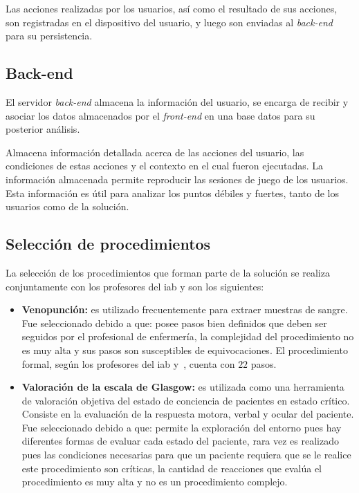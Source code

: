 Las acciones realizadas por los usuarios, así como el resultado de sus acciones,
son registradas en el dispositivo del usuario, y luego son enviadas al
\textit{back-end} para su persistencia.

\subsection{Back-end}

El servidor \textit{back-end} almacena la información del usuario, se encarga
de recibir y asociar los datos almacenados por el \textit{front-end} en una
base datos para su posterior análisis.


Almacena información detallada acerca de las acciones del usuario,
las condiciones de estas acciones y el contexto en el cual fueron ejecutadas.
La información almacenada permite reproducir las sesiones de juego
de los usuarios. Esta información es útil para analizar los puntos débiles y
fuertes, tanto de los usuarios como de la solución.

\subsection{Selección de procedimientos}

La selección de los procedimientos que forman parte de la solución se realiza
conjuntamente con los profesores del \Gls{iab} y son los siguientes:

\begin{itemize}
\item \textbf{Venopunción:} es utilizado frecuentemente para extraer muestras de
    sangre. Fue seleccionado debido a que: posee pasos bien definidos que deben
    ser seguidos por el profesional de enfermería, la complejidad del
    procedimiento no es muy alta y sus pasos son susceptibles de equivocaciones.
    El procedimiento formal, según los profesores del \gls{iab}
    y~\cite{oms:extraccion}, cuenta con $22$ pasos.
\item \textbf{Valoración de la escala de Glasgow:} es utilizada como una
    herramienta de valoración objetiva del estado de conciencia de pacientes en
    estado crítico. Consiste en la evaluación de la respuesta motora, verbal y
    ocular del paciente\cite{protocolo}. Fue seleccionado debido a que: permite
    la exploración del entorno pues hay diferentes formas de evaluar cada estado
    del paciente, rara vez es realizado pues las condiciones necesarias para que
    un paciente requiera que se le realice este procedimiento son críticas, la
    cantidad de reacciones que evalúa el procedimiento es muy alta y no es un
    procedimiento complejo. 
\end{itemize}

